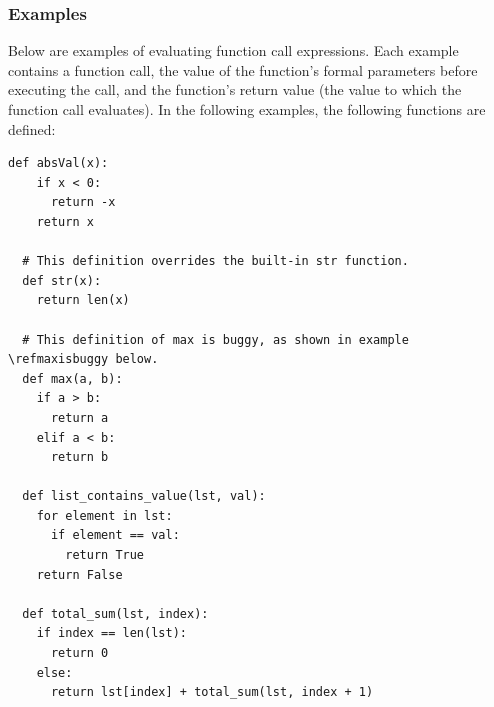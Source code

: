 \documentclass{article}
\begin{document}

\subsubsection{Examples}

  Below are examples of evaluating function call expressions. Each example contains a function call, the value of the function's formal parameters before executing the call, and the function's return value (the value to which the function call evaluates). In the following examples, the following functions are defined:

  \def\refmaxisbuggy{\ref{item:max-is-buggy}}

\begin{Verbatim}[commandchars=\\\{\}]
  def absVal(x):
    if x < 0:
      return -x
    return x

  # This definition overrides the built-in str function.
  def str(x):
    return len(x)

  # This definition of max is buggy, as shown in example \refmaxisbuggy below.
  def max(a, b):
    if a > b:
      return a
    elif a < b:
      return b

  def list_contains_value(lst, val):
    for element in lst:
      if element == val:
        return True
    return False

  def total_sum(lst, index):
    if index == len(lst):
      return 0
    else:
      return lst[index] + total_sum(lst, index + 1)

\end{Verbatim}
\end{document}
